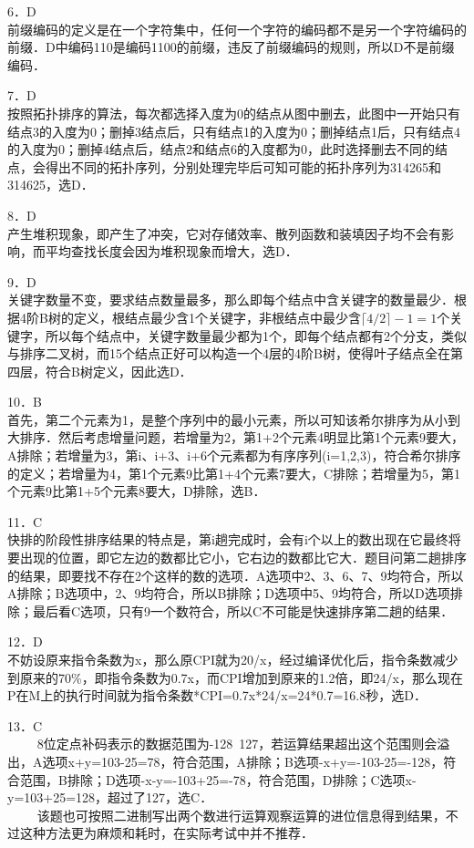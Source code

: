 6．D \\
前缀编码的定义是在一个字符集中，任何一个字符的编码都不是另一个字符编码的前缀．D中编码110是编码1100的前缀，违反了前缀编码的规则，所以D不是前缀编码．

7．D \\
按照拓扑排序的算法，每次都选择入度为0的结点从图中删去，此图中一开始只有结点3的入度为0；删掉3结点后，只有结点1的入度为0；删掉结点1后，只有结点4的入度为0；删掉4结点后，结点2和结点6的入度都为0，此时选择删去不同的结点，会得出不同的拓扑序列，分别处理完毕后可知可能的拓扑序列为314265和314625，选D．

8．D \\
产生堆积现象，即产生了冲突，它对存储效率、散列函数和装填因子均不会有影响，而平均查找长度会因为堆积现象而增大，选D．

9．D \\
关键字数量不变，要求结点数量最多，那么即每个结点中含关键字的数量最少．根据4阶B树的定义，根结点最少含1个关键字，非根结点中最少含$\lceil4/2\rceil-1=1$个关键字，所以每个结点中，关键字数量最少都为1个，即每个结点都有2个分支，类似与排序二叉树，而15个结点正好可以构造一个4层的4阶B树，使得叶子结点全在第四层，符合B树定义，因此选D．

10．B \\
首先，第二个元素为1，是整个序列中的最小元素，所以可知该希尔排序为从小到大排序．然后考虑增量问题，若增量为2，第1+2个元素4明显比第1个元素9要大，A排除；若增量为3，第i、i+3、i+6个元素都为有序序列(i=1,2,3)，符合希尔排序的定义；若增量为4，第1个元素9比第1+4个元素7要大，C排除；若增量为5，第1个元素9比第1+5个元素8要大，D排除，选B．

11．C \\
快排的阶段性排序结果的特点是，第i趟完成时，会有i个以上的数出现在它最终将要出现的位置，即它左边的数都比它小，它右边的数都比它大．题目问第二趟排序的结果，即要找不存在2个这样的数的选项．A选项中2、3、6、7、9均符合，所以A排除；B选项中，2、9均符合，所以B排除；D选项中5、9均符合，所以D选项排除；最后看C选项，只有9一个数符合，所以C不可能是快速排序第二趟的结果．

12．D \\
不妨设原来指令条数为x，那么原CPI就为20/x，经过编译优化后，指令条数减少到原来的70\%，即指令条数为0.7x，而CPI增加到原来的1.2倍，即24/x，那么现在P在M上的执行时间就为指令条数*CPI=0.7x*24/x=24*0.7=16.8秒，选D．

13．C \\
$\qquad$ 8位定点补码表示的数据范围为-128~127，若运算结果超出这个范围则会溢出，A选项x+y=103-25=78，符合范围，A排除；B选项-x+y=-103-25=-128，符合范围，B排除；D选项-x-y=-103+25=-78，符合范围，D排除；C选项x-y=103+25=128，超过了127，选C． \\
$\qquad$ 该题也可按照二进制写出两个数进行运算观察运算的进位信息得到结果，不过这种方法更为麻烦和耗时，在实际考试中并不推荐．

